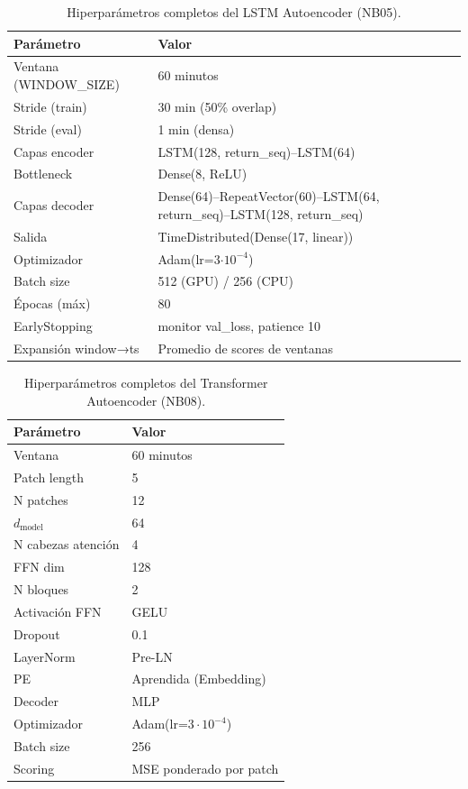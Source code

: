 \begin{table}[H]
\centering
\caption{Hiperparámetros completos del LSTM Autoencoder (NB05).}
\label{tab:hp-lstm}
\small
\begin{tabularx}{0.8\textwidth}{l l}
\toprule
Parámetro & Valor \\
\midrule
Ventana (WINDOW\_SIZE)  & 60 minutos \\
Stride (train)          & 30 min (50\% overlap) \\
Stride (eval)           & 1 min (densa) \\
Capas encoder           & LSTM(128, return\_seq)–LSTM(64) \\
Bottleneck              & Dense(8, ReLU) \\
Capas decoder           & Dense(64)–RepeatVector(60)–LSTM(64, return\_seq)–LSTM(128, return\_seq) \\
Salida                  & TimeDistributed(Dense(17, linear)) \\
Optimizador             & Adam(lr=3$\cdot 10^{-4}$) \\
Batch size              & 512 (GPU) / 256 (CPU) \\
Épocas (máx)            & 80 \\
EarlyStopping           & monitor val\_loss, patience 10 \\
Expansión window→ts    & Promedio de scores de ventanas \\
\bottomrule
\end{tabularx}
\end{table}

\begin{table}[H]
\centering
\caption{Hiperparámetros completos del Transformer Autoencoder (NB08).}
\label{tab:hp-tr}
\small
\begin{tabularx}{0.8\textwidth}{l l}
\toprule
Parámetro & Valor \\
\midrule
Ventana                 & 60 minutos \\
Patch length            & 5 \\
N patches               & 12 \\
$d_{\mathrm{model}}$    & 64 \\
N cabezas atención      & 4 \\
FFN dim                 & 128 \\
N bloques               & 2 \\
Activación FFN          & GELU \\
Dropout                 & 0.1 \\
LayerNorm               & Pre-LN \\
PE                      & Aprendida (Embedding) \\
Decoder                 & MLP \\
Optimizador             & Adam(lr=$3\cdot 10^{-4}$) \\
Batch size              & 256 \\
Scoring                 & MSE ponderado por patch \\
\bottomrule
\end{tabularx}
\end{table}

